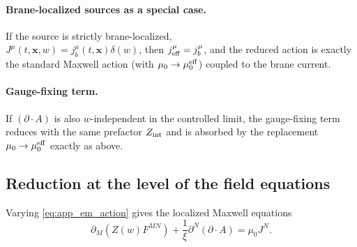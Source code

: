 \documentclass[11pt]{article}
\begin{document}
\paragraph{Brane-localized sources as a special case.}
If the source is strictly brane-localized,\\
\(J^\mu(t,\mathbf{x},w)=j_b^\mu(t,\mathbf{x})\delta(w)\),
then \(j_{\rm eff}^\mu=j_b^\mu\), and the reduced action is exactly the standard Maxwell action
(with \(\mu_0\to\mu_0^{\rm eff}\)) coupled to the brane current.

\paragraph{Gauge-fixing term.}
If \((\partial\!\cdot\!A)\) is also \(w\)-independent in the controlled limit, the gauge-fixing term
reduces with the same prefactor \(Z_{\rm int}\) and is absorbed by the replacement
\(\mu_0\to\mu_0^{\rm eff}\) exactly as above.

\subsection{Reduction at the level of the field equations}
\label{app:eom_reduction}

Varying \eqref{eq:app_em_action} gives the localized Maxwell equations
\begin{equation}
\partial_M\!\left(Z(w)F^{MN}\right) + \frac{1}{\xi}\partial^N(\partial\!\cdot\!A)
=
\mu_0 J^N.
\label{eq:app_localized_maxwell}
\end{equation}
\end{document}

